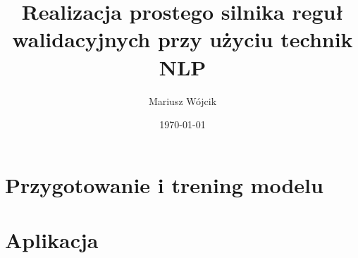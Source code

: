 \documentclass[10pt, a4paper, twoside, titlepage]{report}
\title{Realizacja prostego silnika reguł walidacyjnych przy użyciu technik NLP}
\author{Mariusz Wójcik
}
\date{\today}
\begin{document}
	\maketitle
	
	
 				
	
	
	
   \noindent	
	\part{Przygotowanie i trening modelu}
	
	
	
	
	
	\part{Aplikacja}
	
	
%	






	
\end{document}
